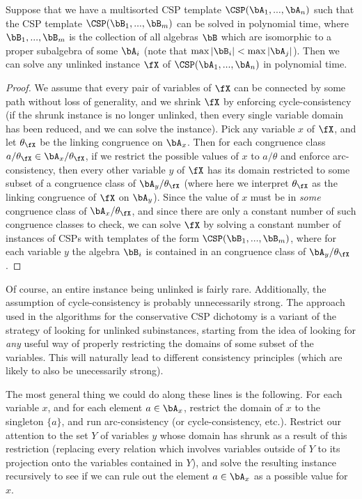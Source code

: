 \begin{prop} Suppose that we have a multisorted CSP template $\CSP(\bA_1, ..., \bA_n)$ such that the CSP template $\CSP(\bB_1, ..., \bB_m)$ can be solved in polynomial time, where $\bB_1, ..., \bB_m$ is the collection of all algebras $\bB$ which are isomorphic to a proper subalgebra of some $\bA_i$ (note that $\max |\bB_i| < \max |\bA_j|$). Then we can solve any unlinked instance $\fX$ of $\CSP(\bA_1, ..., \bA_n)$ in polynomial time.
\end{prop}
\begin{proof} We assume that every pair of variables of $\fX$ can be connected by some path without loss of generality, and we shrink $\fX$ by enforcing cycle-consistency (if the shrunk instance is no longer unlinked, then every single variable domain has been reduced, and we can solve the instance). Pick any variable $x$ of $\fX$, and let $\theta_\fX$ be the linking congruence on $\bA_x$. Then for each congruence class $a/\theta_\fX \in \bA_x/\theta_\fX$, if we restrict the possible values of $x$ to $a/\theta$ and enforce arc-consistency, then every other variable $y$ of $\fX$ has its domain restricted to some subset of a congruence class of $\bA_y/\theta_\fX$ (where here we interpret $\theta_\fX$ as the linking congruence of $\fX$ on $\bA_y$). Since the value of $x$ must be in \emph{some} congruence class of $\bA_x/\theta_\fX$, and since there are only a constant number of such congruence classes to check, we can solve $\fX$ by solving a constant number of instances of CSPs with templates of the form $\CSP(\bB_1, ..., \bB_m)$, where for each variable $y$ the algebra $\bB_i$ is contained in an congruence class of $\bA_y/\theta_\fX$.
\end{proof}

Of course, an entire instance being unlinked is fairly rare. Additionally, the assumption of cycle-consistency is probably unnecessarily strong. The approach used in the algorithms for the conservative CSP dichotomy is a variant of the strategy of looking for unlinked subinstances, starting from the idea of looking for \emph{any} useful way of properly restricting the domains of some subset of the variables. This will naturally lead to different consistency principles (which are likely to also be unecessarily strong).

The most general thing we could do along these lines is the following. For each variable $x$, and for each element $a \in \bA_x$, restrict the domain of $x$ to the singleton $\{a\}$, and run arc-consistency (or cycle-consistency, etc.). Restrict our attention to the set $Y$ of variables $y$ whose domain has shrunk as a result of this restriction (replacing every relation which involves variables outside of $Y$ to its projection onto the variables contained in $Y$), and solve the resulting instance recursively to see if we can rule out the element $a \in \bA_x$ as a possible value for $x$.

